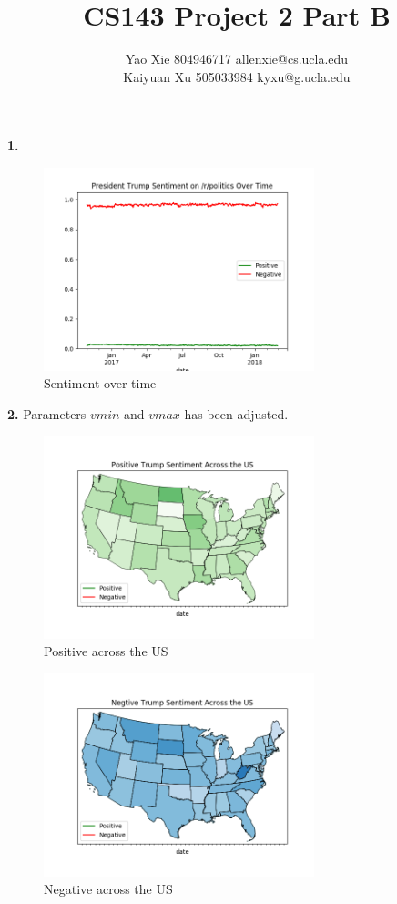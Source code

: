 \documentclass{article}
\begin{document}
\title{CS143 Project 2 Part B}
\author{Yao Xie 804946717 allenxie@cs.ucla.edu\\Kaiyuan Xu 505033984 kyxu@g.ucla.edu}
\maketitle

\textbf{1.}
\begin{figure}[H]
\centering
\includegraphics[width=0.7\textwidth]{1.png}
\caption{Sentiment over time}\label{1}
\end{figure}


\textbf{2.} Parameters $vmin$ and $vmax$ has been adjusted.
\begin{figure}[H]
\centering
\includegraphics[width=0.7\textwidth]{2.png}
\caption{Positive across the US}\label{2}
\end{figure}
\begin{figure}[H]
\centering
\includegraphics[width=0.7\textwidth]{3.png}
\caption{Negative across the US}\label{3}
\end{figure}
\end{document}
